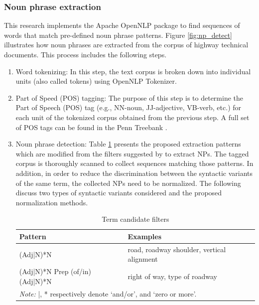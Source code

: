 \documentclass[Journal, BackFigs, DoubleSpace]{ascelike}%
\begin{document}
\subsubsection{Noun phrase extraction}
%
This research implements the Apache OpenNLP package to find sequences of words that match pre-defined noun phrase patterns. Figure \ref{fig:np_detect} illustrates how noun phrases are extracted from the corpus of highway technical documents. This process includes the following steps. %
\begin{enumerate} [label=\roman*]
\item Word tokenizing: In this step, the text corpus is broken down into individual units (also called tokens) using OpenNLP Tokenizer.
\item Part of Speed (POS) tagging: The purpose of this step is to determine the Part of Speech (POS) tag (e.g., NN-noun, JJ-adjective, VB-verb, etc.) for each unit of the tokenized corpus obtained from the previous step. A full set of POS tags can be found in the Penn Treebank \cite{marcus93}.
\item Noun phrase detection: Table \ref{table:term_filter} presents the proposed extraction patterns which are modified from the filters suggested by  to extract NPs. The tagged corpus is thoroughly scanned to collect sequences matching those patterns. 
In addition, in order to reduce the discrimination between the syntactic variants of the same term, the collected NPs need to be normalized. The following discuss two types of syntactic variants considered and the proposed normalization methods.
\begin{table} [t]
		\caption{Term candidate filters}
		\label{table:term_filter}
		\centering
		\small
		\renewcommand{\arraystretch}{1.25}
		\begin{tabular}{l l}
			\hline
			\textbf{Pattern} & \textbf{Examples}\\
			\hline
			(Adj|N)*N		& road, roadway shoulder, vertical alignment\\
			(Adj|N)*N Prep (of/in) (Adj|N)*N	&	right of way, type of roadway\\
			\hline
			\multicolumn{2}{l}{\textit{Note:} |, * respectively denote `and/or', and `zero or more'.  } \\
			\hline
		\end{tabular}
		\normalsize
\end{table}

\end{enumerate}
\end{document}
